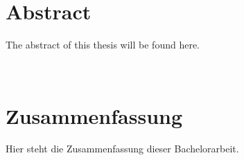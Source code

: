 \section*{Abstract}\label{abtract}
The abstract of this thesis will be found here.

~~

\section*{Zusammenfassung}\label{zusammenfassung}

Hier steht die Zusammenfassung dieser Bachelorarbeit.

\pagebreak

